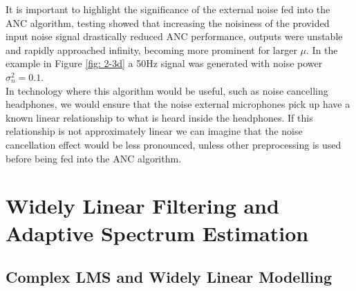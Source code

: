 \documentclass[12pt]{article}
\numberwithin{equation}{section}
\begin{document}
			It is important to highlight the significance of the external noise fed into the ANC algorithm, testing showed that increasing the noisiness of the provided input noise signal drastically reduced ANC performance, outputs were unstable and rapidly approached infinity, becoming more prominent for larger $\mu$. In the example in Figure \ref{fig: 2-3d} a 50Hz signal was generated with noise power $\sigma_n^{ 2}=0.1$.\\
			 In technology where this algorithm would be useful, such as noise cancelling headphones, we would ensure that the noise external microphones pick up have a known linear relationship to what is heard inside the headphones. If this relationship is not approximately linear we can imagine that the noise cancellation effect would be less pronounced, unless other preprocessing is used before being fed into the ANC algorithm.
	
\pagebreak
\section{Widely Linear Filtering and Adaptive Spectrum Estimation} \label{sec: 3-WLASE}
	\subsection{Complex LMS and Widely Linear Modelling} \label{sec: 3-1-CLMS-ACLMS}
\end{document}
